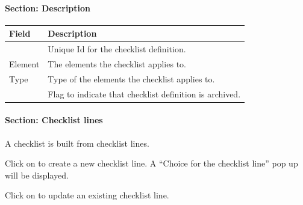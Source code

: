 \documentclass[letterpaper,10pt,english]{sphinxmanual}
\begin{document}
\paragraph{Section: Description}

\begin{tabulary}{\linewidth}{|l|l|}
\hline
\textsf{\relax 
Field
} & \textsf{\relax 
Description
}\\
\hline
{\hyperref[Glossary:term-id]{\emph{}}}
 & 
Unique Id for the checklist definition.
\\
\hline
Element
 & 
The elements the checklist applies to.
\\
\hline
Type
 & 
Type of the elements the checklist applies to.
\\
\hline
{\hyperref[Glossary:term-closed]{\emph{}}}
 & 
Flag to indicate that checklist definition is archived.
\\
\hline\end{tabulary}

\paragraph{Section: Checklist lines}

A checklist is built from checklist lines.

Click  on to create a new checklist line. A “Choice for the checklist line” pop up will be displayed.

Click on  to update an existing checklist line.
\end{document}
